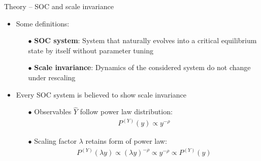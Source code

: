 \documentclass[xcolor=dvipsnames]{beamer}
\newcommand{\myitemsep}{\setlength\itemsep{0.33cm}}
\newcommand{\mysubitemsep}{\setlength\itemsep{0.22cm}}
\begin{document}
    \begin{frame}[t]{Theory -- SOC and scale invariance}
        \begin{itemize}\myitemsep
            \item<1-> Some definitions:
                \begin{itemize}\mysubitemsep
                    \item[$\bullet$] \textbf{SOC system}:
                                     System that naturally evolves into a critical equilibrium state by itself
                                     without parameter tuning
                    \item[$\bullet$] \textbf{Scale invariance}:
                                     Dynamics of the considered system do not change under rescaling
                \end{itemize}\vspace{1em}
            \item<2> Every SOC system is believed to show scale invariance
                \begin{itemize}\mysubitemsep
                    \item[$\bullet$] Observables $\hat{Y}$ follow power law distribution:
                    \begin{align*}
                    P^{(Y)}(y) \propto y^{-\rho}
                    \end{align*}
                    \item[$\bullet$] Scaling factor $\lambda$ retains form of power law:
                    \begin{align*}
                    P^{(Y)}(\lambda y) \propto (\lambda y)^{-\rho} \propto y^{-\rho} \propto P^{(Y)}(y)
                    \end{align*}
                \end{itemize}
        \end{itemize}
    \end{frame}
\end{document}
